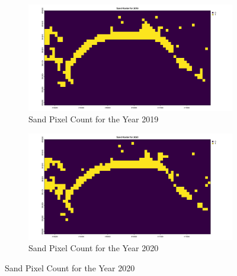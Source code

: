 \documentclass[a4paper,12pt]{article}
\begin{document}
\begin{figure}[H]
    \centering
    \begin{subfigure}[b]{0.48\linewidth}
        \centering
        \includegraphics[width=\linewidth]{Timeline/Sand_2019.png}
        \caption{Sand Pixel Count for the Year 2019}
        \label{fig:Sand_2019}
    \end{subfigure}
    \hspace{0.02\linewidth}
    \begin{subfigure}[b]{0.48\linewidth}
        \centering
        \includegraphics[width=\linewidth]{Timeline/Sand_2020.png}
        \caption{Sand Pixel Count for the Year 2020}
        \label{fig:Sand_2020}
    \end{subfigure}

    \vspace{1em} %


\end{figure}
\end{document}

